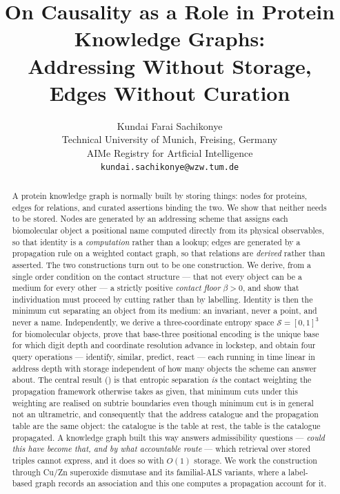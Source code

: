 \documentclass[11pt,twocolumn,a4paper]{article}
\title{\bfseries On Causality as a Role in Protein Knowledge Graphs:\\
Addressing Without Storage, Edges Without Curation}
\author{Kundai Farai Sachikonye\\[2pt]
\small Technical University of Munich, Freising, Germany\\
\small AIMe Registry for Artficial Intelligence\\
\small \texttt{kundai.sachikonye@wzw.tum.de}}
\date{}
\theoremstyle{thmstyle}
\theoremstyle{definition}
\theoremstyle{remark}
\newcommand{\flo}{\beta}
\newcommand{\Sspace}{\mathcal{S}}
\begin{document}
\maketitle

\begin{abstract}
\noindent
A protein knowledge graph is normally built by storing things: nodes
for proteins, edges for relations, and curated assertions binding the
two. We show that neither needs to be stored. Nodes are generated by
an addressing scheme that assigns each biomolecular object a
positional name computed directly from its physical observables, so
that identity is a \emph{computation} rather than a lookup; edges are
generated by a propagation rule on a weighted contact graph, so that
relations are \emph{derived} rather than asserted. The two
constructions turn out to be one construction. We derive, from a
single order condition on the contact structure --- that not every
object can be a medium for every other --- a strictly positive
\emph{contact floor} $\flo > 0$, and show that individuation must
proceed by cutting rather than by labelling. Identity is then the
minimum cut separating an object from its medium: an invariant, never
a point, and never a name. Independently, we derive a three-coordinate
entropy space $\Sspace = [0,1]^3$ for biomolecular objects, prove that
base-three positional encoding is the unique base for which digit
depth and coordinate resolution advance in lockstep, and obtain four
query operations --- identify, similar, predict, react --- each
running in time linear in address depth with storage independent of
how many objects the scheme can answer about. The central result
() is that
entropic separation \emph{is} the contact weighting the propagation
framework otherwise takes as given, that minimum cuts under this
weighting are realised on subtrie boundaries even though minimum cut
is in general not an ultrametric, and consequently that the address
catalogue and the propagation table are the same object: the
catalogue is the table at rest, the table is the catalogue propagated.
A knowledge graph built this way answers admissibility questions ---
\emph{could this have become that, and by what accountable route} ---
which retrieval over stored triples cannot express, and it does so
with $O(1)$ storage. We work the construction through
Cu/Zn superoxide dismutase and its familial-ALS variants, where a
label-based graph records an association and this one computes a
propagation account for it.
\end{abstract}
\end{document}
